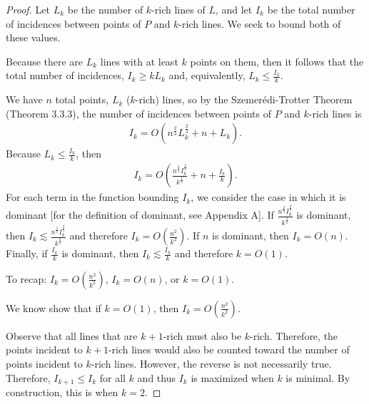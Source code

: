 \documentclass{scrippsthesisclass}
\theoremstyle{definition}
\begin{document}
\begin{proof}
Let $L_k$ be the number of $k$-rich lines of $L$, and let $I_k$ be the total number of incidences between points of $P$ and $k$-rich lines. We seek to bound both of these values. 

Because there are $L_k$ lines with at least $k$ points on them, then it follows that the total number of incidences, $I_k \geq kL_k$ and, equivalently, $L_k \leq \frac{I_k}{k}$. 

We have $n$ total points, $L_k$ ($k$-rich) lines, so by the Szemer\'{e}di-Trotter Theorem (Theorem 3.3.3), the number of incidences between points of $P$ and $k$-rich lines is
\begin{align}
    I_k = O(n^{\frac{2}{3}}L_k^{\frac{2}{3}} + n + L_k).
\end{align}
Because $L_k \leq \frac{I_k}{k}$, then 
\begin{align}
I_k = O\left(\frac{n^{\frac{2}{3}} I_k^{\frac{2}{3}}}{k^{\frac{2}{3}}} + n + \frac{I_k}{k} \right).
\end{align}
For each term in the function bounding $I_k$, we consider the case in which it is dominant [for the definition of dominant, see Appendix A].
If $\frac{n^{\frac{2}{3}} I_k^{\frac{2}{3}}}{k^{\frac{2}{3}}}$ is dominant, then $I_k \lesssim \frac{n^{\frac{2}{3}} I_k^{\frac{2}{3}}}{k^{\frac{2}{3}}}$ and therefore $I_k = O\left(\frac{n^2}{k^2}\right)$. 
If $n$ is dominant, then $I_k = O(n)$.
Finally, if $\frac{I_k}{k}$ is dominant, then $I_k \lesssim \frac{I_k}{k}$ and therefore $k = O(1)$.

To recap: $I_k = O\left(\frac{n^2}{k^2}\right)$, $I_k = O(n)$, or $k = O(1)$. 

We know show that if $k = O(1)$, then $I_k = O\left(\frac{n^2}{k^2}\right)$.

Observe that all lines that are $k + 1$-rich must also be $k$-rich. 
Therefore, the points incident to $k + 1$-rich lines would also be counted toward the number of points incident to $k$-rich lines. 
However, the reverse is not necessarily true.
Therefore, $I_{k+1} \leq I_k$ for all $k$ and thus $I_k$ is maximized when $k$ is minimal.
By construction, this is when $k = 2$. 


\end{proof}
\end{document}
